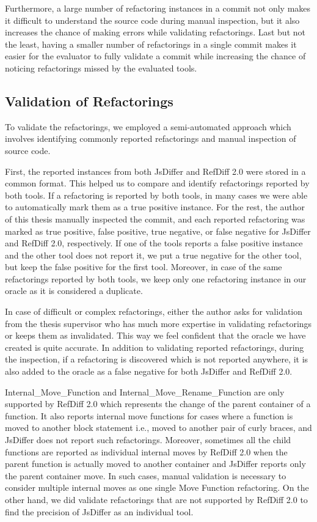 \documentclass[letterpaper,12pt,onecolumn,final]{report}
\begin{document}
Furthermore, a large number of refactoring instances in a commit not only makes it difficult to understand the source code during manual inspection, but it also increases the chance of making errors while validating refactorings. Last but not the least, having a smaller number of refactorings in a single commit makes it easier for the evaluator to fully validate a commit while increasing the chance of noticing refactorings missed by the evaluated tools. 

\subsection {Validation of Refactorings}
To validate the refactorings, we employed a semi-automated approach which involves identifying commonly reported refactorings and manual inspection of source code.

First, the reported instances from both JsDiffer and RefDiff 2.0 were stored in a common format. This helped us to compare and identify refactorings reported by both tools. If a refactoring is reported by both tools, in many cases we were able to automatically mark them as a true positive instance. For the rest, the author of this thesis manually inspected the commit, and each reported refactoring was marked as true positive, false positive, true negative, or false negative for JsDiffer and RefDiff 2.0, respectively. If one of the tools reports a false positive instance and the other tool does not report it, we put a true negative for the other tool, but keep the false positive for the first tool. Moreover, in case of the same refactorings reported by both tools, we keep only one refactoring instance in our oracle as it is considered a duplicate.

In case of difficult or complex refactorings, either the author asks for validation from the thesis supervisor who has much more expertise in validating refactorings or keeps them as invalidated. This way we feel confident that the oracle we have created is quite accurate. In addition to validating reported refactorings, during the inspection, if a refactoring is discovered which is not reported anywhere, it is also added to the oracle as a false negative for both JsDiffer and RefDiff 2.0. 

Internal\_Move\_Function and Internal\_Move\_Rename\_Function are only supported by RefDiff 2.0 which represents the change of the parent container of a function. It also reports internal move functions for cases where a function is moved to another block statement i.e., moved to another pair of curly braces, and JsDiffer does not report such refactorings. Moreover, sometimes all the child functions are reported as individual internal moves by RefDiff 2.0 when the parent function is actually moved to another container and JsDiffer reports only the parent container move. In such cases, manual validation is necessary to consider multiple internal moves as one single Move Function refactoring. On the other hand, we did validate refactorings that are not supported by RefDiff 2.0 to find the precision of JsDiffer as an individual tool.
\end{document}
